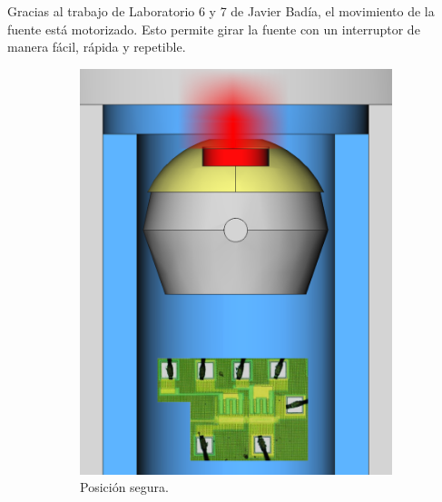 Gracias al trabajo de Laboratorio 6 y 7 de Javier Badía,
el movimiento de la fuente está motorizado.
Esto permite girar la fuente con un interruptor de manera fácil, rápida y repetible.
\begin{figure}[H]
    \centering
    \begin{subfigure}[b]{.45\textwidth}
        \includegraphics{figuras/poster/posicion_no.png}
        \caption{Posición segura.}
        \label{fig:posicionno}
    \end{subfigure}
    \hspace{5mm}
    \begin{subfigure}[b]{.45\textwidth}

\end{subfigure}
\end{figure}
